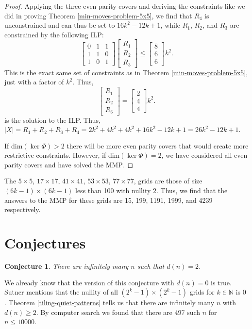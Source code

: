 \documentclass[a4paper]{article}
\newtheorem{conjecture}{Conjecture}
\newcommand{\N}{\mathbb{N}}
\newcommand{\abs}[1]{\left| #1 \right|}
\renewcommand{\dim}[1]{\text{dim}\left( #1 \right)}
\begin{document}
\begin{proof}
		Applying the three even parity covers and deriving the constraints like we did in proving Theorem \ref{min-moves-problem-5x5}, we find that $R_4$ is unconstrained and can thus be set to $16k^2 - 12k + 1$, while $R_1$, $R_2$, and $R_3$ are constrained by the following ILP:
		\begin{equation}
			\begin{bmatrix}
				0 & 1 & 1 \\
				1 & 1 & 0 \\
				1 & 0 & 1 
			\end{bmatrix}
			\begin{bmatrix}
				R_1 \\
				R_2 \\
				R_3
			\end{bmatrix}
			\leq
			\begin{bmatrix}
				8 \\
				6 \\
				6
			\end{bmatrix}k^2.
		\end{equation}
		This is the exact same set of constraints as in Theorem \ref{min-moves-problem-5x5}, just with a factor of $k^2$.
		Thus,
		\begin{equation*}
			\begin{bmatrix}
				R_1 \\
				R_2 \\
				R_3
			\end{bmatrix}
			=
			\begin{bmatrix}
				2 \\
				4 \\
				4
			\end{bmatrix}k^2.
		\end{equation*}
		is the solution to the ILP.
		Thus, $\abs{X} = R_1 + R_2 + R_3 + R_4 = 2k^2 + 4k^2 +  4k^2 + 16k^2 - 12k + 1 = 26k^2 - 12k + 1$.
		
		If $\dim{\ker{\Phi}} > 2$ there will be more even parity covers that would create more restrictive constraints.
		However, if $\dim{\ker{\Phi}} = 2$, we have considered all even parity covers and have solved the MMP.
	\end{proof}

	The $5 \times 5$, $17 \times 17$, $41 \times 41$, $53 \times 53$, $77 \times 77$, grids are those of size $(6k-1) \times (6k-1)$ less than 100 with nullity 2.
	Thus, we find that the answers to the MMP for these grids are 15, 199, 1191, 1999, and 4239 respectively.
	
	\section{Conjectures}
	\begin{conjecture}\label{infinite-nullity-2}
		There are infinitely many $n$ such that $d(n) = 2$.
	\end{conjecture}
	We already know that the version of this conjecture with $d(n)=0$ is true.
	Sutner mentions that the nullity of all $(2^k - 1) \times (2^k - 1)$ grids for $k \in \N$ is 0 \cite{Sutner1989}.
	Theorem \ref{tiling-quiet-patterns} tells us that there are infinitely many $n$ with $d(n) \geq 2$.
	By computer search we found that there are 497 such $n$ for $n \leq 10000$.
	
\end{document}
